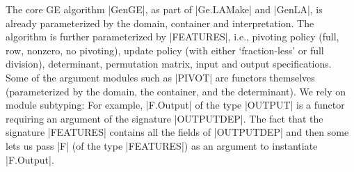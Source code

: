 \documentclass{elsart}
\begin{document}
The core GE algorithm |GenGE|, as part of |Ge.LAMake| and |GenLA|, is
already parameterized by the domain, container and interpretation.
The algorithm is further parameterized by |FEATURES|, i.e., pivoting
policy (full, row, nonzero, no pivoting), update policy (with either
`fraction-less' or full division), determinant, permutation matrix,
input and output specifications. Some of the argument modules such as
|PIVOT| are functors themselves (parameterized by the domain, the
container, and the determinant).  We rely on module subtyping: For
example, |F.Output| of the type |OUTPUT| is a functor requiring an
argument of the signature |OUTPUTDEP|. The fact that the signature
|FEATURES| contains all the fields of |OUTPUTDEP| and then some lets
us pass |F| (of the type |FEATURES|) as an argument to instantiate
|F.Output|.
\end{document}
